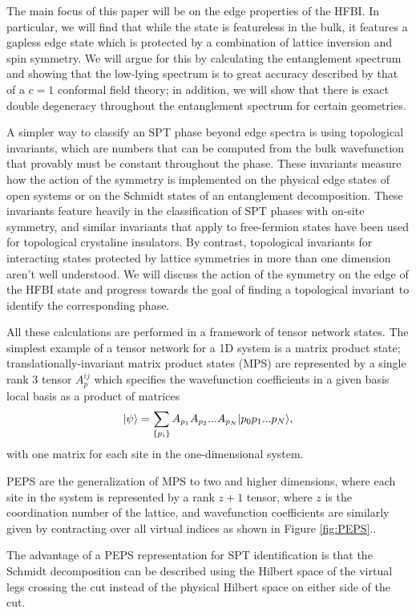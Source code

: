 The main focus of this paper will be on the edge properties of the HFBI.
In particular, we will find that while the state is featureless in the bulk, it
features a gapless edge state which is protected by a combination of lattice inversion
and spin symmetry. We will argue for this by calculating the entanglement spectrum and showing
that the low-lying spectrum is to great accuracy described by that of a $c=1$
conformal field theory; in addition, we will show that there is exact double 
degeneracy throughout the entanglement spectrum for certain geometries.

A simpler way to classify an SPT phase beyond edge spectra is using 
topological invariants, which are numbers that can be computed from the bulk 
wavefunction that provably must be constant throughout the phase. These 
invariants measure how the action of the symmetry is implemented on the 
physical edge states of open systems or on the Schmidt states of an 
entanglement decomposition. These invariants feature heavily in the 
classification of SPT phases with on-site symmetry, and similar invariants 
that apply to free-fermion states have been used for topological crystaline 
insulators. By contrast, topological invariants for interacting states 
protected by lattice symmetries in more than one dimension aren't well 
understood. We will discuss the action of the symmetry on the edge of the HFBI 
state and progress towards the goal of finding a topological invariant to 
identify the corresponding phase.

All these calculations are performed in a framework of tensor network states.
The simplest example of a tensor network for a 1D system is a matrix
product state; translationally-invariant matrix product states (MPS)
are represented by a single rank 3 tensor $A_p^{ij}$ which specifies
the wavefunction coefficients in a given basis local basis as a
product of matrices $$\vert \psi \rangle = \sum\limits_{\{p_i\}} A_{p_1}
A_{p_2} ... A_{p_N} \vert p_0 p_1 ... p_N \rangle,$$ with one matrix for each
site in the one-dimensional system.

PEPS are the generalization of MPS to two and higher dimensions, where
each site in the system is represented by a rank $z+1$ tensor, where
$z$ is the coordination number of the lattice, and wavefunction
coefficients are similarly given by contracting over all virtual
indices as shown in Figure \ref{fig:PEPS}.\cite{verstraete2004}.

The advantage of a PEPS representation for SPT identification is that the 
Schmidt decomposition can be described using the Hilbert space of the virtual 
legs crossing the cut instead of the physical Hilbert space on either side of 
the cut.